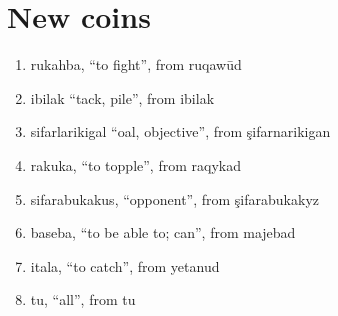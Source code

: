 \documentclass{thiguka}
\begin{document}
\section{New coins}
\begin{enumerate}
    \item rukahba, ``to fight'', from ruqawūd
    \item ibilak ``tack, pile'', from ibilak
    \item sifarlarikigal ``oal, objective'', from şifarnarikigan
    \item rakuka, ``to topple'', from raqykad
    \item sifarabukakus, ``opponent'', from şifarabukakyz
    \item baseba, ``to be able to; can'', from majebad
    \item itala, ``to catch'', from yetanud
    \item tu, ``all'', from tu
\end{enumerate}
\end{document}
